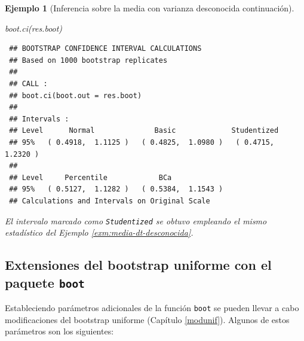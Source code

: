 \documentclass[
  10pt,
]{book}
\newenvironment{Shaded}{\begin{snugshade}}{\end{snugshade}}
\newcommand{\FunctionTok}[1]{\textcolor[rgb]{0.00,0.00,0.00}{#1}}
\newcommand{\NormalTok}[1]{#1}
\theoremstyle{break}
\newtheorem{example}{Ejemplo}[chapter]
\theoremstyle{nonumberplain}
\begin{document}
\begin{example}[Inferencia sobre la media con varianza desconocida continuación]
\begin{Shaded}
\begin{Highlighting}[]
\FunctionTok{boot.ci}\NormalTok{(res.boot)}
\end{Highlighting}
\end{Shaded}

\begin{verbatim}
 ## BOOTSTRAP CONFIDENCE INTERVAL CALCULATIONS
 ## Based on 1000 bootstrap replicates
 ## 
 ## CALL : 
 ## boot.ci(boot.out = res.boot)
 ## 
 ## Intervals : 
 ## Level      Normal              Basic             Studentized     
 ## 95%   ( 0.4918,  1.1125 )   ( 0.4825,  1.0980 )   ( 0.4715,  1.2320 )  
 ## 
 ## Level     Percentile            BCa          
 ## 95%   ( 0.5127,  1.1282 )   ( 0.5384,  1.1543 )  
 ## Calculations and Intervals on Original Scale
\end{verbatim}

El intervalo marcado como \texttt{Studentized} se obtuvo empleando el mismo estadístico del Ejemplo \ref{exm:media-dt-desconocida}.
\end{example}

\hypertarget{extensiones-del-bootstrap-uniforme-con-el-paquete-boot}{%
\subsection{\texorpdfstring{Extensiones del bootstrap uniforme con el paquete \texttt{boot}}{Extensiones del bootstrap uniforme con el paquete boot}}\label{extensiones-del-bootstrap-uniforme-con-el-paquete-boot}}

Estableciendo parámetros adicionales de la función \texttt{boot} se pueden llevar
a cabo modificaciones del bootstrap uniforme (Capítulo \ref{modunif}).
Algunos de estos parámetros son los siguientes:
\end{document}
